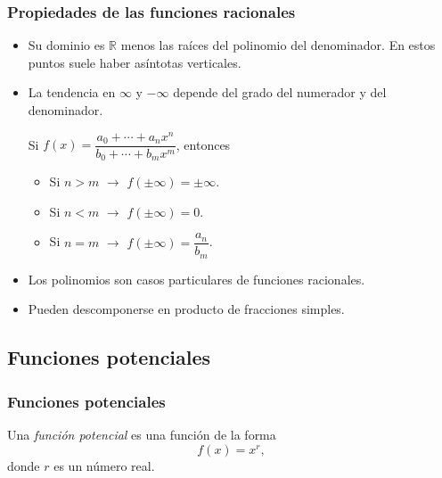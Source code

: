 \begin{frame}
\frametitle{Propiedades de las funciones racionales}
\begin{itemize}
\item Su dominio es $\mathbb{R}$ menos las raíces del polinomio del denominador. En estos puntos suele haber asíntotas verticales.
\item La tendencia en $\infty$ y $-\infty$ depende del grado del numerador y del denominador. 

Si $f(x)=\dfrac{a_0+\cdots +a_nx^n}{b_0+\cdots+b_mx^m}$, entonces
\begin{itemize}
  \item Si $n>m$ $\rightarrow$ $f(\pm\infty)=\pm\infty$.
  \item Si $n<m$ $\rightarrow$ $f(\pm\infty)=0$.
  \item Si $n=m$ $\rightarrow$ $f(\pm\infty)=\dfrac{a_n}{b_m}$.
\end{itemize}
\item Los polinomios son casos particulares de funciones racionales. 
\item Pueden descomponerse en producto de fracciones simples.
\end{itemize}
\end{frame} 



\subsection{Funciones potenciales}
\begin{frame}
\frametitle{Funciones potenciales}
\begin{definicion}
Una \emph{función potencial} es una función de la forma
\[
f(x)=x^r,
\]
donde $r$ es un número real.
\end{definicion}
\begin{center}
\scalebox{1}{}
\end{center}
\end{frame} 


